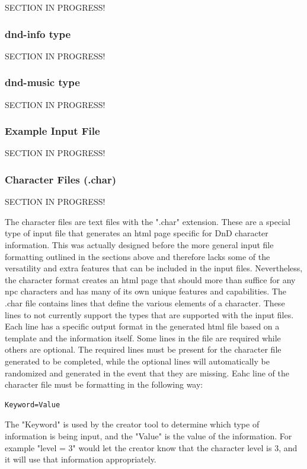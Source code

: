 SECTION IN PROGRESS!

\subsubsection{dnd-info type}

SECTION IN PROGRESS!

\subsubsection{dnd-music type}

SECTION IN PROGRESS!

\subsubsection{Example Input File}

SECTION IN PROGRESS!




\subsubsection{Character Files (.char)}

SECTION IN PROGRESS!

The character files are text files with the ".char" extension. These are a special type of input file that generates an html page specific for DnD character information. This was actually designed before the more general input file formatting outlined in the sections above and therefore lacks some of the versatility and extra features that can be included in the input files. Nevertheless, the character format creates an html page that should more than suffice for any npc characters and has many of its own unique features and capabilities. The .char file contains lines that define the various elements of a character. These lines to not currently support the types that are supported with the input files. Each line has a specific output format in the generated html file based on a template and the information itself. Some lines in the file are required while others are optional. The required lines must be present for the character file generated to be completed, while the optional lines will automatically be randomized and generated in the event that they are missing. Eahc line of the character file must be formatting in the following way:
\begin{lstlisting}
Keyword=Value
\end{lstlisting}
The "Keyword" is used by the creator tool to determine which type of information is being input, and the "Value" is the value of the information. For example "level = 3" would let the creator know that the character level is 3, and it will use that information appropriately.

